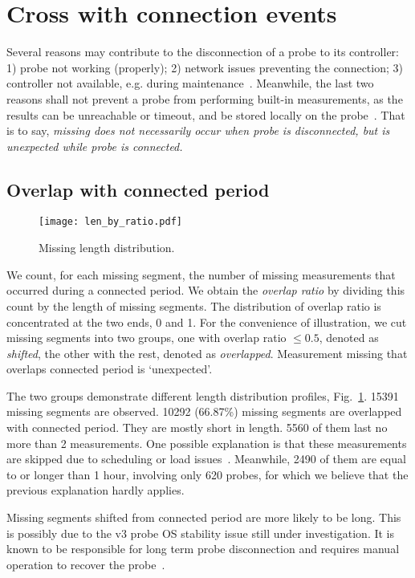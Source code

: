 \documentclass{sig-alternate-10pt}
\begin{document}
\section{Cross with connection events}
Several reasons may contribute to the disconnection of a probe to its controller: 1) probe not working (properly); 2) network issues preventing the connection; 3) controller not available, e.g. during maintenance~\cite{controller}. Meanwhile, the last two reasons shall not prevent a probe from performing built-in measurements, as the results can be unreachable or timeout, and be stored locally on the probe~\cite{usb}. 
That is to say, \textit{missing does not necessarily occur when probe is disconnected, but is unexpected while probe is connected.}

\subsection{Overlap with connected period}
\begin{figure}[!htb]
\centering
\texttt{[image: len\_by\_ratio.pdf]}
\caption{Missing length distribution.}
\label{fig:len_ratio}
\end{figure}
We count, for each missing segment, the number of missing measurements that occurred during a connected period.
We obtain the \textit{overlap ratio} by dividing this count by the length of missing segments. 
The distribution of overlap ratio is concentrated at the two ends, 0 and 1. 
For the convenience of illustration, we cut missing segments into two groups, one with overlap ratio $\leq0.5$, denoted as \textit{shifted}, the other with the rest, denoted as \textit{overlapped}.
Measurement missing that overlaps connected period is `unexpected'.

The two groups demonstrate different length distribution profiles, Fig.~\ref{fig:len_ratio}.
15391 missing segments are observed. 
10292 (66.87\%) missing segments are overlapped with connected period. 
They are mostly short in length. 5560 of them last no more than 2 measurements. 
One possible explanation is that these measurements are skipped due to scheduling or load issues~\cite{schedule, Holterbach2015a}.
Meanwhile, 2490 of them are equal to or longer than 1 hour, involving only 620 probes, for which we believe that the previous explanation hardly applies.

Missing segments shifted from connected period are more likely to be long. This is possibly due to the v3 probe OS stability issue still under investigation. It is known to be responsible for long term probe disconnection and requires manual operation to recover the probe~\cite{usb, 1look, 2look, 3look}.
\end{document}
